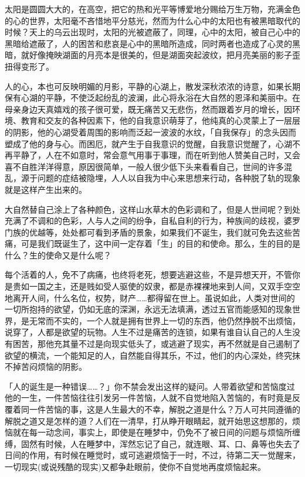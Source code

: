 \documentclass[12pt,twoside,openany]{book}
\begin{document}
太阳是圆圆大大的，在高空，把它的热和光平等博爱地分赐给万生万物，充满金色的心的世界，太阳毫不吝惜地平分慈光，然而为什么心中的太阳也有被黑暗取代的时候？天上的乌云出现时，太阳的光被遮蔽了，同理，心中的太阳，被自己心中的黑暗给遮蔽了，人的困苦和悲哀是心中的黑暗所造成，同时两者也造成了心灵的黑暗，就好像掩映湖面的月亮本是很美的，但是湖面突起波纹，把月亮美丽的影子歪扭得变形了。

人的心，本也可反映明媚的月影，平静的心湖上，散发深秋浓浓的诗意，如果长期保有心湖的平静，不使泛起纷乱的波澜，此心将永浴在大自然的恩泽和美丽中。在母亲身边天真嬉戏的孩子很可爱，既无痛苦又无悲伤，然而跟着岁月的增长，因环境、教育和交友的各种因素下，他的自我意识萌芽了，他纯真的心灵蒙上了一层层的阴影，他的心湖受着周围的影响而泛起一波波的水纹，「自我保存」的念头因而塑成了他的身与心。而困厄，就产生于自我意识的觉醒，自我意识觉醒了，心湖不再平静了，人在不如意时，常会意气用事于事理，而在听到他人赞美自己时，又会喜不自胜洋洋得意，原因很简单，一般人很少低下头来看看自己，世间的许多混乱，源于问题的症结被隐埋，人人以自我为中心来思想来行动，各种脱了轨的现象就是这样产生出来的。

大自然替自己涂上了各种颜色，这样山水草木的色彩调和了，但是人世间呢？到处充满了不调和的色彩，人与人之间的纷争，自私自利的行为，种族间的歧视，婆罗门族的优越等，处处都可看到矛盾的景象，如果我们不诞生，我们就可免去这些苦痛，可是我们既诞生了，这中间一定存着「生」的目的和使命。那么，生的目的是什么？生的使命又是什么呢？

每个活着的人，免不了病痛，也终将老死，想要逃避这些，不是异想天开，不管你是贵如一国之主，还是贱如受人驱使的奴隶，都是赤裸裸地来到人间，又双手空空地离开人间，什么名位，权势，财产……都得留在世上。虽说如此，人类对世间的一切所抱持的欲望，仍如无底的深渊，永远无法填满，透过五官而能感知的现象世界，是无常而不实的，一个人就是拥有世界上一切的东西，他仍然挣脱不出烦恼，说穿了，人都是欲望的玩物。人生不过是痛苦的连锁，如果有谁自认自己的人生没有困苦，那他充其量不过是向现实低头了，或逃避了现实，再不然就是自己遏制了欲望的横流，一个能知足的人，自然能自得其乐，不过，他们的内心深处，终究抹不掉苦闷烦恼的阴影。

「人的诞生是一种错误……？」你不禁会发出这样的疑问。人带着欲望和苦恼度过他的一生，一件苦恼往往引发另一件苦恼，人就不自觉地陷入苦恼的，有时竟是反覆着同一件苦恼的事，这是人生最大的不幸，解脱之道是什么？万人可共同遵循的解脱之道又是怎样的道？人们在一清早，打从睁开眼睛起，就开始思这想那的，烦恼就在每一动念间，事实上，即使是在睡梦中，仍免不了被日间的问题与烦恼所缠缚，固然有时候，人在睡梦中，浑然忘记了自己，就连眼、耳、口、鼻等也失去了日间的作用，有时候在睡觉时，或可逃避烦恼于一时，不过，待第二天一觉醒来，一切现实(或说残酷的现实)又都争赴眼前，使你不自觉地再度烦恼起来。
\end{document}
